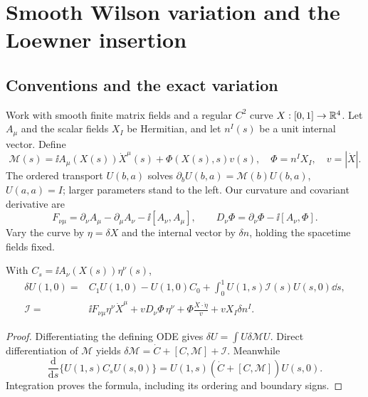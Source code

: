 \section{Smooth Wilson variation and the Loewner insertion}\label{sec:variation}

\subsection{Conventions and the exact variation}

Work with smooth finite matrix fields and a regular $C^2$ curve
$X:[0,1]\to\mathbb R^4$. Let $A_\mu$ and the scalar fields $X_I$ be Hermitian,
and let $n^I(s)$ be a unit internal vector. Define
\begin{equation}
 \mathcal M(s)=\ii A_\mu(X(s))\dot X^\mu(s)+\Phi(X(s),s)v(s),
 \quad\Phi=n^I X_I,\quad v=|\dot X|.
\end{equation}
The ordered transport $U(b,a)$ solves
$\partial_bU(b,a)=\mathcal M(b)U(b,a)$, $U(a,a)=I$; larger parameters
stand to the left. Our curvature and covariant derivative are
\begin{equation}
 F_{\nu\mu}=\partial_\nu A_\mu-\partial_\mu A_\nu
             -\ii[A_\nu,A_\mu],\qquad
 D_\nu\Phi=\partial_\nu\Phi-\ii[A_\nu,\Phi].
\end{equation}
Vary the curve by $\eta=\delta X$ and the internal vector by $\delta n$,
holding the spacetime fields fixed.

\begin{proposition}\label{prop:variation}
With $C_s=\ii A_\nu(X(s))\eta^\nu(s)$,
\begin{align}\label{eq:variation}
 \delta U(1,0)={}&C_1U(1,0)-U(1,0)C_0
 +\int_0^1 U(1,s)\mathcal I(s)U(s,0)\dd s,\\
 \mathcal I={}&\ii F_{\nu\mu}\eta^\nu\dot X^\mu
 +vD_\nu\Phi\,\eta^\nu
 +\Phi\frac{\dot X\cdot\dot\eta}{v}
 +vX_I\delta n^I.\label{eq:insertion}
\end{align}
\end{proposition}
\begin{proof}
Differentiating the defining ODE gives $\delta U=\int U\delta\mathcal M U$.
Direct differentiation of $\mathcal M$ yields
$\delta\mathcal M=\dot C+[C,\mathcal M]+\mathcal I$.
Meanwhile
\begin{equation}
 \frac{\mathrm d}{\mathrm ds}\{U(1,s)C_sU(s,0)\}
 =U(1,s)(\dot C+[C,\mathcal M])U(s,0).
\end{equation}
Integration proves the formula, including its ordering and boundary signs.
\end{proof}

